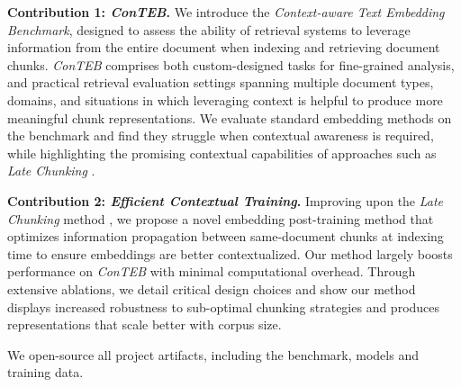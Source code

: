 

\noindent\textbf{Contribution 1: \textit{ConTEB}.}  
We introduce the \emph{Context-aware Text Embedding Benchmark}, designed to assess the ability of retrieval systems to leverage information from the entire document when indexing and retrieving document chunks. \emph{ConTEB} comprises both custom-designed tasks for fine-grained analysis, and practical retrieval evaluation settings spanning multiple document types, domains, and situations in which leveraging context is helpful to produce more meaningful chunk representations. 
We evaluate standard embedding methods on the benchmark and find they struggle when contextual awareness is required, while highlighting the promising contextual capabilities of approaches such as \emph{Late Chunking} .

\noindent\textbf{Contribution 2: \textit{Efficient Contextual Training}.}  
Improving upon the \textit{Late Chunking} method , we propose a novel embedding post-training method that optimizes information propagation between same-document chunks at indexing time to ensure embeddings are better contextualized. Our method largely boosts performance on \emph{ConTEB} %
with minimal computational overhead. 
Through extensive ablations, we detail critical design choices and show our method displays increased robustness to sub-optimal chunking strategies and produces representations that scale better with corpus size. 

We open-source all project artifacts, including the benchmark, models and training data.

